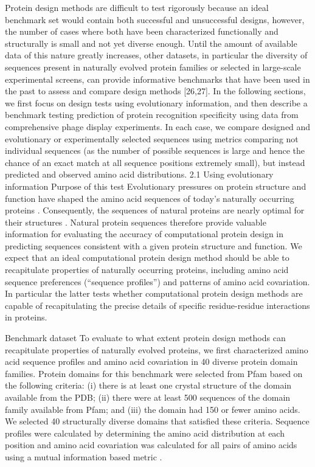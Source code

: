 Protein design methods are difficult to test rigorously because an ideal benchmark set would contain both successful and unsuccessful designs, however, the number of cases where both have been characterized functionally and structurally is small and not yet diverse enough. Until the amount of available data of this nature greatly increases, other datasets, in particular the diversity of sequences present in naturally evolved protein families or selected in large-scale experimental screens, can provide informative benchmarks that have been used in the past to assess and compare design methods
[26,27]. In the following sections, we first focus on design tests using evolutionary information, and then describe a benchmark testing prediction of protein recognition specificity using data from comprehensive phage display experiments. In each case, we compare designed and evolutionary or experimentally selected sequences using metrics comparing not individual sequences (as the number of possible sequences is large and hence the chance of an exact match at all sequence positions extremely small), but instead predicted and observed amino acid distributions.
2.1 Using evolutionary information
Purpose of this test
Evolutionary pressures on protein structure and function have shaped the amino acid sequences of today's naturally occurring proteins \cite{dokholyan_understanding_2001}. Consequently, the sequences of natural proteins are nearly optimal for their structures \cite{kuhlman_native_2000}. Natural protein sequences therefore provide valuable information for evaluating the accuracy of computational protein design in predicting sequences consistent with a given protein structure and function. We expect that an ideal computational protein design method should be able to recapitulate properties of naturally occurring proteins, including amino acid sequence preferences (“sequence profiles”) and patterns of amino acid covariation. In particular the latter tests whether computational protein design methods are capable of recapitulating the precise details of specific residue-residue interactions in proteins.

Benchmark dataset
To evaluate to what extent protein design methods can recapitulate properties of naturally evolved proteins, we first characterized amino acid sequence profiles and amino acid covariation in 40 diverse protein domain families. Protein domains for this benchmark were selected from Pfam \cite{finn_pfam:_2014} based on the following criteria: (i) there is at least one crystal structure of the domain available from the PDB; (ii) there were at least 500 sequences of the domain family available from Pfam; and (iii) the domain had 150 or fewer amino acids. We selected 40 structurally diverse domains that satisfied these criteria. Sequence profiles were calculated by determining the amino acid distribution at each position and amino acid covariation was calculated for all pairs of amino acids using a mutual information based metric \cite{dickson_identifying_2010}.

